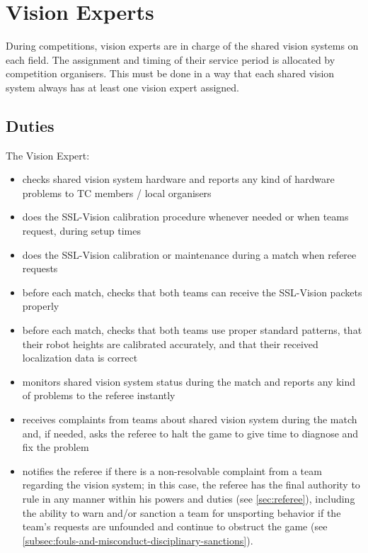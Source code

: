 \section{ Vision Experts}\label{app:vision-experts}

During competitions, vision experts are in charge of the shared vision systems on each field.
The assignment and timing of their service period is allocated by competition organisers.
This must be done in a way that each shared vision system always has at least one vision expert assigned.

\subsection{Duties}
The Vision Expert:
\begin{itemize}
\item checks  shared vision system hardware and reports any kind of hardware problems to TC members / local organisers
\item does the SSL-Vision calibration procedure whenever needed or when teams request, during setup times
\item does the SSL-Vision calibration or maintenance during a match when referee requests
\item before each match, checks that both teams can receive the SSL-Vision packets properly
\item before each match, checks that both teams use proper standard patterns, that their robot heights are calibrated accurately, and that their received localization data is correct
\item monitors  shared vision system status during the match and reports any kind of problems to the referee instantly
\item receives complaints from teams about  shared vision system during the match and, if needed, asks the referee to halt the game to give time to diagnose and fix the problem
\item notifies the referee if there is a non-resolvable complaint from a team regarding the vision system; in this case, the referee has the final authority to rule in any manner within his powers and duties (see \autoref{sec:referee}), including the ability to warn and/or sanction a team for unsporting behavior if the team's requests are unfounded and continue to obstruct the game (see \autoref{subsec:fouls-and-misconduct-disciplinary-sanctions}).
\end{itemize}